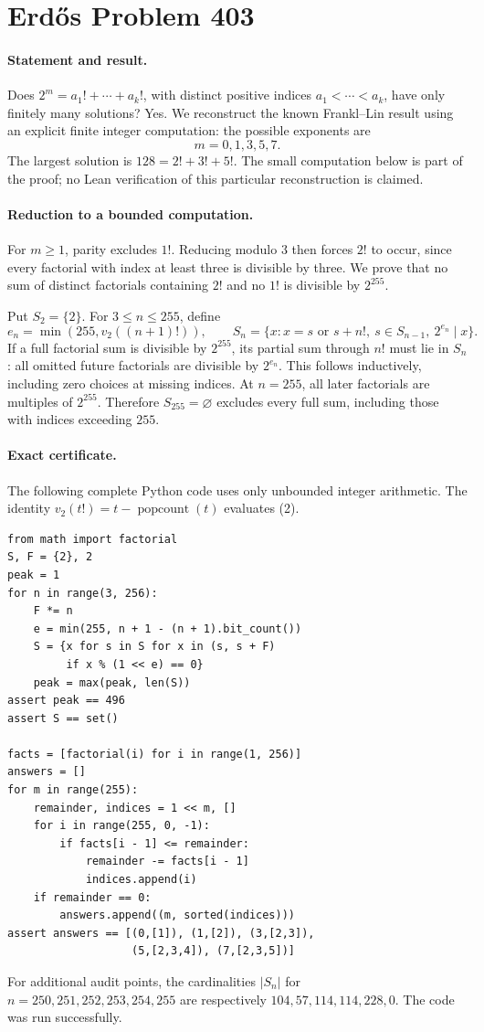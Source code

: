 \section*{Erd\H{o}s Problem 403}

\paragraph{Statement and result.}
Does \(2^m=a_1!+\cdots+a_k!\), with distinct positive indices
\(a_1<\cdots<a_k\), have only finitely many solutions?
Yes. We reconstruct the known Frankl--Lin result using an explicit finite
integer computation: the possible exponents are
\[
 m=0,1,3,5,7.
 \tag{1}
\]
The largest solution is \(128=2!+3!+5!\).
The small computation below is part of the proof; no Lean verification
of this particular reconstruction is claimed.

\paragraph{Reduction to a bounded computation.}
For \(m\geq1\), parity excludes \(1!\). Reducing modulo \(3\)
then forces \(2!\) to occur, since every factorial with index at least
three is divisible by three. We prove that no sum of distinct factorials
containing \(2!\) and no \(1!\) is divisible by \(2^{255}\).

Put \(S_2=\{2\}\). For \(3\leq n\leq255\), define
\[
 e_n=\min(255,v_2((n+1)!)),\qquad
 S_n=\{x:x=s\text{ or }s+n!,\ s\in S_{n-1},\ 2^{e_n}\mid x\}.
 \tag{2}
\]
If a full factorial sum is divisible by \(2^{255}\), its partial
sum through \(n!\) must lie in \(S_n\): all omitted future factorials
are divisible by \(2^{e_n}\). This follows inductively, including
zero choices at missing indices. At \(n=255\), all later factorials
are multiples of \(2^{255}\). Therefore \(S_{255}=\varnothing\)
excludes every full sum, including those with indices exceeding \(255\).

\paragraph{Exact certificate.}
The following complete Python code uses only unbounded integer arithmetic.
The identity \(v_2(t!)=t-\operatorname{popcount}(t)\) evaluates (2).
\begin{verbatim}
from math import factorial
S, F = {2}, 2
peak = 1
for n in range(3, 256):
    F *= n
    e = min(255, n + 1 - (n + 1).bit_count())
    S = {x for s in S for x in (s, s + F)
         if x % (1 << e) == 0}
    peak = max(peak, len(S))
assert peak == 496
assert S == set()

facts = [factorial(i) for i in range(1, 256)]
answers = []
for m in range(255):
    remainder, indices = 1 << m, []
    for i in range(255, 0, -1):
        if facts[i - 1] <= remainder:
            remainder -= facts[i - 1]
            indices.append(i)
    if remainder == 0:
        answers.append((m, sorted(indices)))
assert answers == [(0,[1]), (1,[2]), (3,[2,3]),
                   (5,[2,3,4]), (7,[2,3,5])]
\end{verbatim}
For additional audit points, the cardinalities \(|S_n|\) for
\(n=250,251,252,253,254,255\) are respectively
\(104,57,114,114,228,0\). The code was run successfully.

